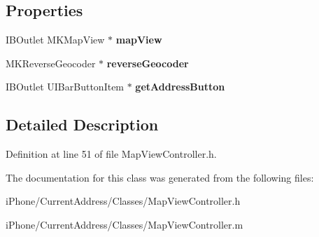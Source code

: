 \subsection*{Properties}
\begin{DoxyCompactItemize}
\item 
\hypertarget{interface_map_view_controller_a250ca1eb6ca5dbeef2c758cfb6c54352}{I\-B\-Outlet M\-K\-Map\-View $\ast$ {\bfseries map\-View}}\label{interface_map_view_controller_a250ca1eb6ca5dbeef2c758cfb6c54352}

\item 
\hypertarget{interface_map_view_controller_a773225e6535bdafdcde9dbc38e648d90}{M\-K\-Reverse\-Geocoder $\ast$ {\bfseries reverse\-Geocoder}}\label{interface_map_view_controller_a773225e6535bdafdcde9dbc38e648d90}

\item 
\hypertarget{interface_map_view_controller_ad82a4da45ee7fedf7ccf752d8f227de0}{I\-B\-Outlet U\-I\-Bar\-Button\-Item $\ast$ {\bfseries get\-Address\-Button}}\label{interface_map_view_controller_ad82a4da45ee7fedf7ccf752d8f227de0}

\end{DoxyCompactItemize}


\subsection{Detailed Description}


Definition at line 51 of file Map\-View\-Controller.\-h.



The documentation for this class was generated from the following files\-:\begin{DoxyCompactItemize}
\item 
i\-Phone/\-Current\-Address/\-Classes/Map\-View\-Controller.\-h\item 
i\-Phone/\-Current\-Address/\-Classes/Map\-View\-Controller.\-m\end{DoxyCompactItemize}
